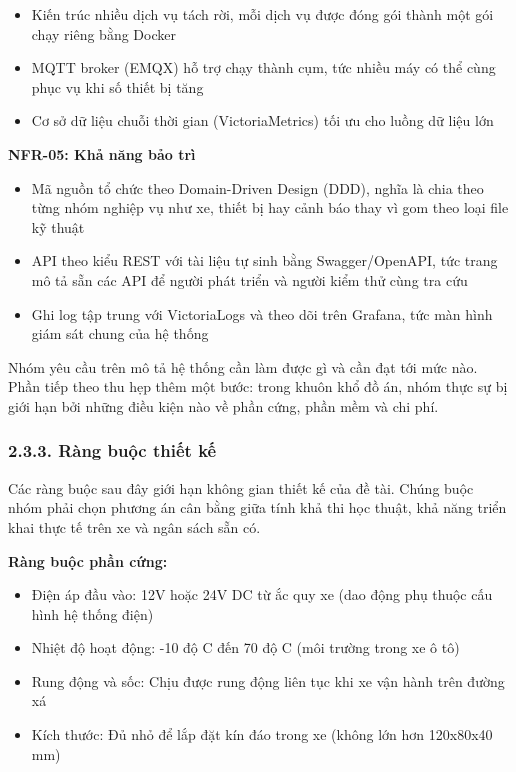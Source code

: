 \documentclass[a4paper]{extarticle}
\providecommand{\tightlist}{%
  \setlength{\itemsep}{0pt}\setlength{\parskip}{0pt}}
\begin{document}
\begin{itemize}
\tightlist
\item
  Kiến trúc nhiều dịch vụ tách rời, mỗi dịch vụ được đóng gói thành
  một gói chạy riêng bằng Docker
\item
  MQTT broker (EMQX) hỗ trợ chạy thành cụm, tức nhiều máy có thể cùng
  phục vụ khi số thiết bị tăng
\item
  Cơ sở dữ liệu chuỗi thời gian (VictoriaMetrics) tối ưu cho luồng dữ
  liệu lớn
\end{itemize}

\textbf{NFR-05: Khả năng bảo trì}

\begin{itemize}
\tightlist
\item
  Mã nguồn tổ chức theo Domain-Driven Design (DDD), nghĩa là chia theo
  từng nhóm nghiệp vụ như xe, thiết bị hay cảnh báo thay vì gom theo
  loại file kỹ thuật
\item
  API theo kiểu REST với tài liệu tự sinh bằng Swagger/OpenAPI, tức
  trang mô tả sẵn các API để người phát triển và người kiểm thử cùng tra
  cứu
\item
  Ghi log tập trung với VictoriaLogs và theo dõi trên Grafana, tức màn
  hình giám sát chung của hệ thống
\end{itemize}

Nhóm yêu cầu trên mô tả hệ thống cần làm được gì và cần đạt tới mức nào.
Phần tiếp theo thu hẹp thêm một bước: trong khuôn khổ đồ án, nhóm thực
sự bị giới hạn bởi những điều kiện nào về phần cứng, phần mềm và chi
phí.

\subsubsection{2.3.3. Ràng buộc thiết
kế}\label{233-ruxe0ng-buux1ed9c-thiux1ebft-kux1ebf}

Các ràng buộc sau đây giới hạn không gian thiết kế của đề tài. Chúng buộc
nhóm phải chọn phương án cân bằng giữa tính khả thi học thuật, khả năng
triển khai thực tế trên xe và ngân sách sẵn có.

\textbf{Ràng buộc phần cứng:}

\begin{itemize}
\tightlist
\item
  Điện áp đầu vào: 12V hoặc 24V DC từ ắc quy xe (dao động phụ thuộc cấu
  hình hệ thống điện)
\item
  Nhiệt độ hoạt động: -10 độ C đến 70 độ C (môi trường trong xe ô tô)
\item
  Rung động và sốc: Chịu được rung động liên tục khi xe vận hành trên
  đường xá
\item
  Kích thước: Đủ nhỏ để lắp đặt kín đáo trong xe (không lớn hơn
  120x80x40 mm)
\end{itemize}
\end{document}
